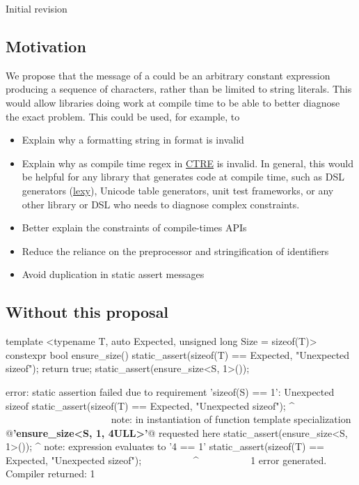 \documentclass{wg21}
\begin{document}
Initial revision

\subsection{Motivation}

We propose that the message of a  could be an arbitrary constant expression producing a sequence of characters,
rather than be limited to string literals.
This would allow libraries doing work at compile time to be able to better diagnose the exact problem.
This could be used, for example, to
\begin{itemize}
    \item Explain why a formatting string in format is invalid
    \item Explain why as compile time regex in \href{https://github.com/hanickadot/compile-time-regular-expressions}{CTRE} is invalid. In general, this would be helpful for any library that generates code at compile time, such as DSL generators (\href{https://github.com/foonathan/lexy}{lexy}), Unicode table generators, unit test frameworks, or any other library or DSL who needs to diagnose complex constraints.
    \item Better explain the constraints of compile-times APIs
    \item Reduce the reliance on the preprocessor and stringification of identifiers
    \item Avoid duplication in static assert messages
\end{itemize}

\pagebreak
\subsection{Without this proposal}

\begin{colorblock}
template <typename T, auto Expected, unsigned long Size = sizeof(T)>
constexpr bool ensure_size() {
    static_assert(sizeof(T) == Expected, "Unexpected sizeof");
    return true;
}
static_assert(ensure_size<S, 1>());
\end{colorblock}

\begin{quoteblock}
\begin{codeblock}
error: static assertion failed due to requirement 'sizeof(S) == 1':
    Unexpected sizeof
static_assert(sizeof(T) == Expected, "Unexpected sizeof");
^             ~~~~~~~~~~~~~~~~~~~~~
note: in instantiation of function template specialization
    @\textbf{'ensure_size<S, 1, 4ULL>'}@ requested here
static_assert(ensure_size<S, 1>());
^
note: expression evaluates to '4 == 1'
static_assert(sizeof(T) == Expected, "Unexpected sizeof");
~~~~~~~~~~^~~~~~~~~~~
1 error generated.
Compiler returned: 1
\end{codeblock}
\end{quoteblock}
\end{document}
